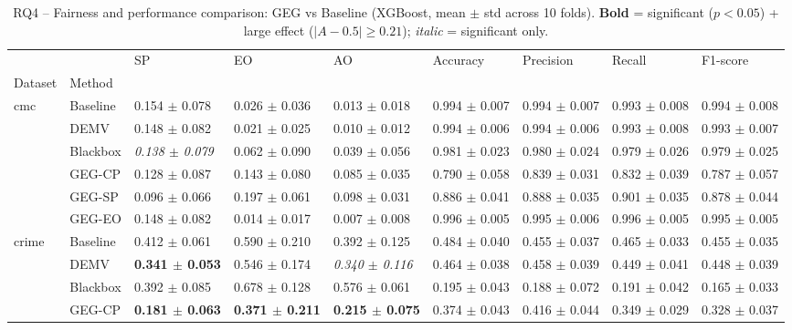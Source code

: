 \begin{table}
\caption{RQ4 -- Fairness and performance comparison: GEG vs Baseline (XGBoost, mean $\pm$ std across 10 folds). \textbf{Bold} = significant ($p{<}0.05$) + large effect ($|A{-}0.5|{\geq}0.21$); \textit{italic} = significant only.}
\label{tab:rq4_xgb}
\begin{tabular}{lllllllll}
\toprule
 &  & SP & EO & AO & Accuracy & Precision & Recall & F1-score \\
Dataset & Method &  &  &  &  &  &  &  \\
\midrule
\multirow[t]{6}{*}{cmc} & Baseline & 0.154 $\pm$ 0.078 & 0.026 $\pm$ 0.036 & 0.013 $\pm$ 0.018 & 0.994 $\pm$ 0.007 & 0.994 $\pm$ 0.007 & 0.993 $\pm$ 0.008 & 0.994 $\pm$ 0.008 \\
 & DEMV & 0.148 $\pm$ 0.082 & 0.021 $\pm$ 0.025 & 0.010 $\pm$ 0.012 & 0.994 $\pm$ 0.006 & 0.994 $\pm$ 0.006 & 0.993 $\pm$ 0.008 & 0.993 $\pm$ 0.007 \\
 & Blackbox & \textit{0.138 $\pm$ 0.079} & 0.062 $\pm$ 0.090 & 0.039 $\pm$ 0.056 & 0.981 $\pm$ 0.023 & 0.980 $\pm$ 0.024 & 0.979 $\pm$ 0.026 & 0.979 $\pm$ 0.025 \\
 & GEG-CP & 0.128 $\pm$ 0.087 & 0.143 $\pm$ 0.080 & 0.085 $\pm$ 0.035 & 0.790 $\pm$ 0.058 & 0.839 $\pm$ 0.031 & 0.832 $\pm$ 0.039 & 0.787 $\pm$ 0.057 \\
 & GEG-SP & 0.096 $\pm$ 0.066 & 0.197 $\pm$ 0.061 & 0.098 $\pm$ 0.031 & 0.886 $\pm$ 0.041 & 0.888 $\pm$ 0.035 & 0.901 $\pm$ 0.035 & 0.878 $\pm$ 0.044 \\
 & GEG-EO & 0.148 $\pm$ 0.082 & 0.014 $\pm$ 0.017 & 0.007 $\pm$ 0.008 & 0.996 $\pm$ 0.005 & 0.995 $\pm$ 0.006 & 0.996 $\pm$ 0.005 & 0.995 $\pm$ 0.005 \\
\cline{1-9}
\multirow[t]{6}{*}{crime} & Baseline & 0.412 $\pm$ 0.061 & 0.590 $\pm$ 0.210 & 0.392 $\pm$ 0.125 & 0.484 $\pm$ 0.040 & 0.455 $\pm$ 0.037 & 0.465 $\pm$ 0.033 & 0.455 $\pm$ 0.035 \\
 & DEMV & \textbf{0.341 $\pm$ 0.053} & 0.546 $\pm$ 0.174 & \textit{0.340 $\pm$ 0.116} & 0.464 $\pm$ 0.038 & 0.458 $\pm$ 0.039 & 0.449 $\pm$ 0.041 & 0.448 $\pm$ 0.039 \\
 & Blackbox & 0.392 $\pm$ 0.085 & 0.678 $\pm$ 0.128 & 0.576 $\pm$ 0.061 & 0.195 $\pm$ 0.043 & 0.188 $\pm$ 0.072 & 0.191 $\pm$ 0.042 & 0.165 $\pm$ 0.033 \\
 & GEG-CP & \textbf{0.181 $\pm$ 0.063} & \textbf{0.371 $\pm$ 0.211} & \textbf{0.215 $\pm$ 0.075} & 0.374 $\pm$ 0.043 & 0.416 $\pm$ 0.044 & 0.349 $\pm$ 0.029 & 0.328 $\pm$ 0.037 \\

\end{tabular}
\end{table}
